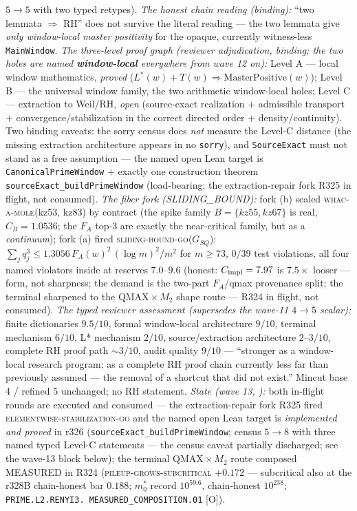 {$5 \to 5$ with two typed retypes).  \emph{The honest chain reading
(binding):} ``two lemmata $\Rightarrow$ RH'' does not survive the
literal reading --- the two lemmata give \emph{only window-local
master positivity} for the opaque, currently witness-less
\texttt{MainWindow}.  \emph{The three-level proof graph (reviewer
adjudication, binding; the two holes are named
\textbf{window-local} everywhere from wave 12 on):} Level A ---
local window mathematics, \emph{proved} ($L^*(w) + T(w)
\Rightarrow \mathrm{MasterPositive}(w)$); Level B --- the
universal window family, the two arithmetic window-local holes;
Level C --- extraction to Weil/RH, \emph{open} (source-exact
realization $+$ admissible transport $+$
convergence/stabilization in the correct directed order $+$
density/continuity).  Two binding caveats: the sorry census does
\emph{not} measure the Level-C distance (the missing extraction
architecture appears in no \texttt{sorry}), and
\texttt{SourceExact} must not stand as a free assumption --- the
named open Lean target is \texttt{CanonicalPrimeWindow} $+$
exactly one construction theorem
\texttt{sourceExact\_buildPrimeWindow} (load-bearing; the
extraction-repair fork R325 in flight, not consumed).  \emph{The
fiber fork (SLIDING\_BOUND):} fork (b) sealed
\textsc{whac-a-mole}(kz53, kz83) by contract (the spike family
$B = \{kz55, kz67\}$ is real, $C_B = 1.0536$; the $F_A$ top-3 are
exactly the near-critical family, but as a \emph{continuum});
fork (a) fired \textsc{sliding-bound-go}($G_{SQ}$): $\sum_j q_j^3
\le 1.3056\,F_A(w)^2\,(\log m)^2/m^2$ for $m \ge 73$, $0/39$ test
violations, all four named violators inside at reserves
$7.0$--$9.6$ (honest: $C_{\rm impl} = 7.97$ is $7.5\times$ looser
--- form, not sharpness; the demand is the two-part $F_A$/qmax
provenance split; the terminal sharpened to the
QMAX${}\times M_2$ shape route --- R324 in flight, not consumed).
\emph{The typed reviewer assessment (supersedes the wave-11
$4 \to 5$ scalar):} finite dictionaries $9.5/10$, formal
window-local architecture $9/10$, terminal mechanism $6/10$, L*
mechanism $2/10$, source/extraction architecture $2$--$3/10$,
complete RH proof path $\sim 3/10$, audit quality $9/10$ ---
``stronger as a window-local research program; as a complete RH
proof chain currently less far than previously assumed --- the
removal of a shortcut that did not exist.''  Mincut base 4 /
refined 5 unchanged; no RH statement.  \emph{State (wave 13,
):} both in-flight
rounds are executed and consumed --- the extraction-repair fork
R325 fired \textsc{elementwise-stabilization-go} and the named
open Lean target is \emph{implemented and proved} in r326
(\texttt{sourceExact\_buildPrimeWindow}; census $5 \to 8$ with
three named typed Level-C statements --- the census caveat
partially discharged; see the wave-13 block below); the terminal
QMAX${}\times M_2$ route composed MEASURED in R324
(\textsc{pileup-grows-subcritical} $+0.172$ --- subcritical also
at the r328B chain-honest bar $0.188$; $m_0^*$ record $10^{59.6}$,
chain-honest $10^{238}$;
\texttt{PRIME.L2.\allowbreak RENYI3.\allowbreak
MEASURED\_COMPOSITION.01} [O]).\par}


